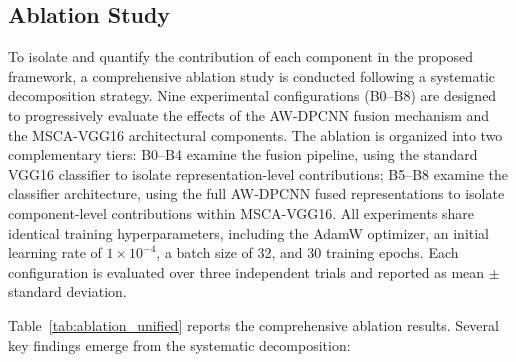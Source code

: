 \documentclass[journal]{IEEEtran}
\begin{document}

\subsection{Ablation Study}
\label{sec:ablation}

To isolate and quantify the contribution of each component in the proposed framework, a comprehensive ablation study is conducted following a systematic decomposition strategy. Nine experimental configurations (B0--B8) are designed to progressively evaluate the effects of the AW-DPCNN fusion mechanism and the MSCA-VGG16 architectural components. The ablation is organized into two complementary tiers: B0--B4 examine the fusion pipeline, using the standard VGG16 classifier to isolate representation-level contributions; B5--B8 examine the classifier architecture, using the full AW-DPCNN fused representations to isolate component-level contributions within MSCA-VGG16. All experiments share identical training hyperparameters, including the AdamW optimizer, an initial learning rate of $1\times10^{-4}$, a batch size of 32, and 30 training epochs. Each configuration is evaluated over three independent trials and reported as mean $\pm$ standard deviation.



Table~\ref{tab:ablation_unified} reports the comprehensive ablation results. Several key findings emerge from the systematic decomposition:
\end{document}
